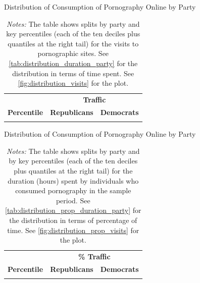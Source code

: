 \documentclass[12pt,twoside]{article}
\begin{document}
\begin{table}[ht] \centering \small \setlength\tabcolsep{10 pt}
	\caption{Distribution of Consumption of Pornography Online by Party}
	\label{tab:distribution_visits_party}
	\begin{adjustbox}{max width=\textwidth}
		\begin{tabular}{crr}
			\toprule
			\multicolumn{1}{l}{\textbf{}}&\multicolumn{2}{c}{\textbf{Traffic}}\\
			\cmidrule(l){2-3}
			\multicolumn{1}{l}{\textbf{Percentile}}&\multicolumn{1}{c}{\textbf{Republicans}}&\multicolumn{1}{c}{\textbf{Democrats}}\\
			\midrule
            \\
			\bottomrule
		\end{tabular}
	\end{adjustbox}
	\caption*{\footnotesize \emph{Notes:} 
		The table shows splits by party and key percentiles (each of the ten deciles plus quantiles at the right tail) for the visits to pornographic sites.
		See \cref{tab:distribution_duration_party} for the distribution in terms of time spent. 
		See \cref{fig:distribution_visits} for the plot.
	}
\end{table}


\begin{table}[ht] \centering \small \setlength\tabcolsep{10 pt}
	\caption{Distribution of Consumption of Pornography Online by Party}
	\label{tab:distribution_prop_visits_party}
	\begin{adjustbox}{max width=\textwidth}
		\begin{tabular}{crr}
			\toprule
			\multicolumn{1}{l}{\textbf{}}&\multicolumn{2}{c}{\textbf{\% Traffic}}\\
			\cmidrule(l){2-3}
			\multicolumn{1}{l}{\textbf{Percentile}}&\multicolumn{1}{c}{\textbf{Republicans}}&\multicolumn{1}{c}{\textbf{Democrats}}\\
			\midrule
            \\
			\bottomrule
		\end{tabular}
	\end{adjustbox}
	\caption*{\footnotesize \emph{Notes:} 
		The table shows splits by party and by key percentiles (each of the ten deciles plus quantiles at the right tail) for the duration (hours) spent by individuals who consumed pornography in the sample period. 
		See \cref{tab:distribution_prop_duration_party} for the distribution in terms of percentage of time. 
		See \cref{fig:distribution_prop_visits} for the plot.
	}
\end{table}
\end{document}
